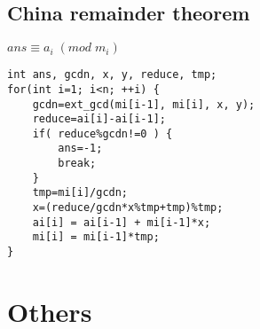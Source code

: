 \documentclass[11pt,twocolumn,a4paper]{article}
\begin{document}
\subsection{China remainder theorem}
$ ans \equiv  a_i\; (mod\; m_i) $
\begin{lstlisting}[label=China remainder theorem]
int ans, gcdn, x, y, reduce, tmp;
for(int i=1; i<n; ++i) {
	gcdn=ext_gcd(mi[i-1], mi[i], x, y);
	reduce=ai[i]-ai[i-1];
	if( reduce%gcdn!=0 ) {
		ans=-1;
		break;
	}
	tmp=mi[i]/gcdn;
	x=(reduce/gcdn*x%tmp+tmp)%tmp;
	ai[i] = ai[i-1] + mi[i-1]*x;
	mi[i] = mi[i-1]*tmp;
}
\end{lstlisting}


\newpage
\section{Others}
\end{document}
